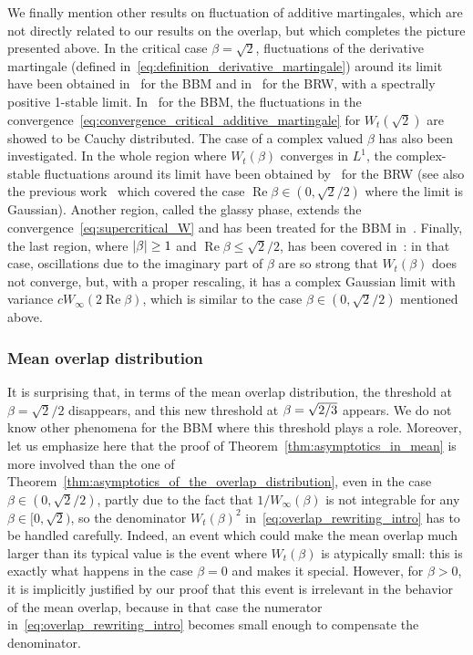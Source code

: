 \documentclass[10pt]{amsart}
\theoremstyle{definition}\newtheorem{defi}[theo]{Definition}\newtheorem{rema}[theo]{Remark}\newtheorem{exam}[theo]{Example}\newtheorem{exem}[theo]{Example}\newtheorem{nota}[theo]{Notation}
\DeclareMathOperator{\re}{Re}
\newcommand\1{\mathds{1}}
\newcommand{\abs}[1]{\left\lvert#1\right\rvert}
\let\originalleft\left
\let\originalright\right
\renewcommand{\left}{\mathopen{}\mathclose\bgroup\originalleft}
\renewcommand{\right}{\aftergroup\egroup\originalright}
\begin{document}
We finally mention other results on fluctuation of additive martingales, which are not directly related to our results on the overlap, but which completes the picture presented above. In the critical case $\beta=\sqrt{2}$, fluctuations of the derivative martingale (defined in~\eqref{eq:definition_derivative_martingale}) around its limit have been obtained in~\cite{MaillardPain2019} for the BBM and in~\cite{BuraczewskiIksanovMallein2021,HouRenSong2024} for the BRW, with a spectrally positive 1-stable limit. In~\cite{MaillardPain2021} for the BBM, the fluctuations in the convergence~\eqref{eq:convergence_critical_additive_martingale} for $W_t(\sqrt{2})$ are showed to be Cauchy distributed. The case of a complex valued $\beta$ has also been investigated. In the whole region where $W_t(\beta)$ converges in $L^1$, the complex-stable fluctuations around its limit have been obtained by~\cite{IksanovKoleskoMeiners2020} for the BRW (see also the previous work~\cite{HartungKlimovsky2018} which covered the case $\re\beta \in (0,\sqrt{2}/2)$ where the limit is Gaussian). Another region, called the glassy phase, extends the convergence~\eqref{eq:supercritical_W} and has been treated for the BBM in~\cite{HartungKlimovsky2015,MadauleRhodesVargas2015}. Finally, the last region, where $\abs{\beta} \geq 1$ and $\re\beta \leq \sqrt{2}/2$, has been covered in~\cite{HartungKlimovsky2018}: in that case, oscillations due to\pagebreak{} the imaginary part of $\beta$ are so strong that $W_t(\beta)$ does not converge, but, with a proper rescaling, it has a complex Gaussian limit with variance $c W_\infty(2\re\beta)$, which is similar to the case $\beta \in (0,\sqrt{2}/2)$ mentioned above.

\subsubsection*{Mean overlap distribution}
It is surprising that, in terms of the mean overlap distribution, the threshold at $\beta = \sqrt{2}/2$ disappears, and this new threshold at $\beta = \sqrt{2\smash{/}3}$ appears. We do not know other phenomena for the BBM where this threshold plays a role. Moreover, let us emphasize here that the proof of Theorem~\ref{thm:asymptotics_in_mean} is more involved than the one of Theorem~\ref{thm:asymptotics_of_the_overlap_distribution}, even in the case $\beta \in (0,\sqrt{2}/2)$, partly due to the fact that $1/W_\infty(\beta)$ is not integrable for any $\beta \in [0,\sqrt{2})$, so the denominator $W_t(\beta)^2$ in~\eqref{eq:overlap_rewriting_intro} has to be handled carefully. Indeed, an event which could make the mean overlap much larger than its typical value is the event where $W_t(\beta)$ is atypically small: this is exactly what happens in the case $\beta=0$ and makes it special. However, for $\beta>0$, it is implicitly justified by our proof that this event is irrelevant in the behavior of the mean overlap, because in that case the numerator in~\eqref{eq:overlap_rewriting_intro} becomes small enough to compensate the denominator.
\end{document}

